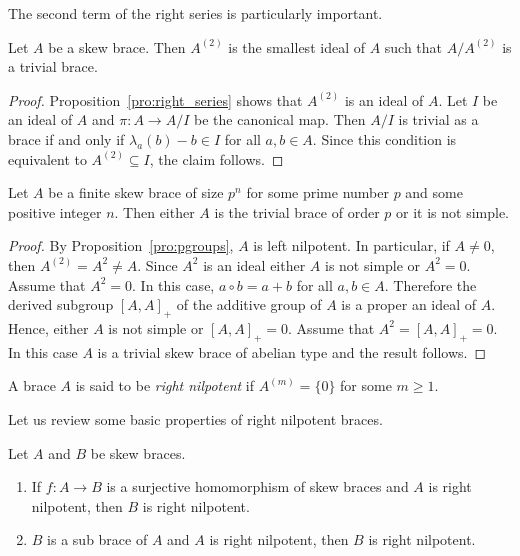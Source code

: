 The second term of the right series is particularly important.

\begin{proposition}
 Let $A$ be a skew brace. Then $A^{(2)}$ is the smallest ideal of $A$
 such that $A/A^{(2)}$ is a trivial brace.
\end{proposition}

\begin{proof}
    Proposition~\ref{pro:right_series} shows that $A^{(2)}$ is an ideal of $A$. 
    Let $I$ be an ideal of $A$ and $\pi\colon A\to A/I$ be the canonical map. Then
    $A/I$ is trivial as a brace if and only if $\lambda_a(b)-b\in I$ for all
    $a,b\in A$. Since this condition is equivalent to $A^{(2)}\subseteq I$, the claim
    follows.
\end{proof}

\begin{corollary}
    Let $A$ be a finite skew brace of size $p^n$ for some prime number $p$
    and some positive integer $n$.  Then either $A$ is the trivial brace of
    order $p$ or it is not simple.
\end{corollary}

\begin{proof}
 By Proposition~\ref{pro:pgroups}, $A$ is left nilpotent. In
 particular, if $A\neq 0$, then $A^{(2)}=A^2\neq A$. Since $A^2$ is an ideal either $A$
 is not simple or $A^2=0$. Assume that $A^2=0$. In this case, $a\circ b=a+b$
 for all $a,b\in A$. Therefore the derived subgroup $[A,A]_+$ of the additive group of $A$ is a proper an ideal of $A$. Hence,
 either $A$ is not simple or $[A,A]_+=0$. Assume that $A^2=[A,A]_+=0$. In this case
 $A$ is a trivial skew brace of abelian type and the result follows.
\end{proof}


\begin{definition}
    A brace $A$ is said to be \emph{right nilpotent}
    if $A^{(m)}=\{0\}$ for some $m\geq1$.
\end{definition}

Let us review some basic properties of right nilpotent braces. 

\begin{lemma}
    \label{lem:right_nilpotent:quotient}
    Let $A$ and $B$ be skew braces. 
    \begin{enumerate}
        \item If $f\colon A\to B$ is a surjective homomorphism of skew braces and 
        $A$ is right nilpotent, then $B$ is right nilpotent.
        \item $B$ is a sub brace of $A$ and $A$ is right nilpotent, then 
        $B$ is right nilpotent.
    \end{enumerate}
\end{lemma}

